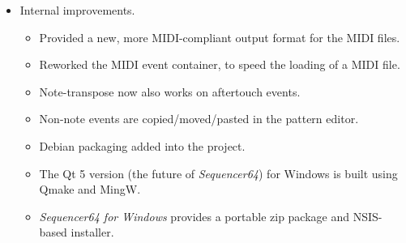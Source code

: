 \documentclass[
 11pt,
 twoside,
 a4paper,
 headinclude,
 footinclude,
 final                                 %
]{article}
\begin{document}
\begin{itemize}
      \item Internal improvements.
      \begin{itemize}
         \item Provided a new, more MIDI-compliant output format for the MIDI
            files.
         \item Reworked the MIDI event container, to
            speed the loading of a MIDI file.
         \item Note-transpose now also works on aftertouch events.
         \item Non-note events are copied/moved/pasted in the pattern editor.
         \item Debian packaging added into the project.
         \item The Qt 5 version (the future of \textsl{Sequencer64}) for
            Windows is built using Qmake and MingW.
         \item \textsl{Sequencer64 for Windows} provides a
            portable zip package and NSIS-based installer.
      \end{itemize}
   \end{itemize}
\end{document}

